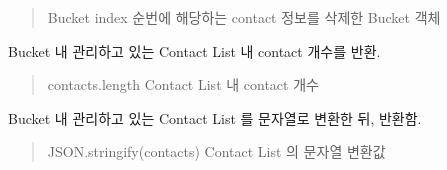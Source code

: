 \documentclass[a4paper,10pt,english]{sphinxmanual}
\begin{document}
\begin{fulllineitems}
\begin{fulllineitems}
\begin{quote}
\begin{description}
\begin{itemize}
\end{itemize}

\sphinxAtStartPar
Bucket \sphinxhyphen{} index 순번에 해당하는 contact 정보를 삭제한 Bucket 객체

\end{description}\end{quote}

\end{fulllineitems}


\begin{fulllineitems}
\label{\detokenize{_kademlia:Bucket.size}}
\pysigstartsignatures
{}
\pysigstopsignatures
\sphinxAtStartPar
Bucket 내 관리하고 있는 Contact List 내 contact 개수를 반환.
\begin{quote}\begin{description}
\sphinxAtStartPar
contacts.length \sphinxhyphen{} Contact List 내 contact 개수

\end{description}\end{quote}

\end{fulllineitems}


\begin{fulllineitems}
\label{\detokenize{_kademlia:Bucket.toString}}
\pysigstartsignatures
{}
\pysigstopsignatures
\sphinxAtStartPar
Bucket 내 관리하고 있는 Contact List 를 문자열로 변환한 뒤, 반환함.
\begin{quote}\begin{description}
\sphinxAtStartPar
JSON.stringify(contacts) \sphinxhyphen{} Contact List 의 문자열 변환값

\end{description}\end{quote}

\end{fulllineitems}


\end{fulllineitems}
\end{document}
